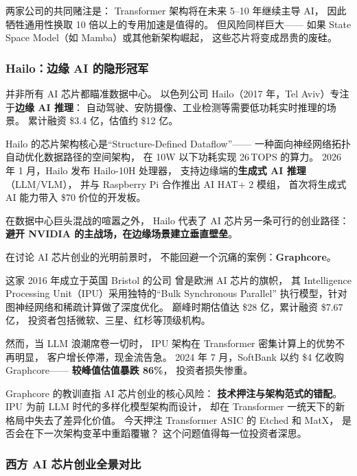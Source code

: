 两家公司的共同赌注是：
Transformer 架构将在未来 5--10 年继续主导 AI，
因此牺牲通用性换取 10 倍以上的专用加速是值得的。
但风险同样巨大——
如果 State Space Model（如 Mamba）或其他新架构崛起，
这些芯片将变成昂贵的废硅。

\subsubsection{Hailo：边缘 AI 的隐形冠军}

并非所有 AI 芯片都瞄准数据中心。
以色列公司 Hailo（2017 年，Tel Aviv）专注于\textbf{边缘 AI 推理}：
自动驾驶、安防摄像、工业检测等需要低功耗实时推理的场景。
累计融资 \$3.4 亿，估值约 \$12 亿。

Hailo 的芯片架构核心是``Structure-Defined Dataflow''——
一种面向神经网络拓扑自动优化数据路径的空间架构，
在 10W 以下功耗实现 26\,TOPS 的算力。
2026 年 1 月，Hailo 发布 Hailo-10H 处理器，
支持边缘端的\textbf{生成式 AI 推理}（LLM/VLM），
并与 Raspberry Pi 合作推出 AI HAT+ 2 模组，
首次将生成式 AI 能力带入 \$70 价位的开发板。

在数据中心巨头混战的喧嚣之外，
Hailo 代表了 AI 芯片另一条可行的创业路径：
\textbf{避开 NVIDIA 的主战场，在边缘场景建立垂直壁垒}。

\begin{warnbox}
在讨论 AI 芯片创业的光明前景时，
不能回避一个沉痛的案例：\textbf{Graphcore}。

这家 2016 年成立于英国 Bristol 的公司
曾是欧洲 AI 芯片的旗帜，
其 Intelligence Processing Unit（IPU）采用独特的``Bulk Synchronous Parallel''
执行模型，针对图神经网络和稀疏计算做了深度优化。
巅峰时期估值达 \$28 亿，累计融资 \$7.67 亿，
投资者包括微软、三星、红杉等顶级机构。

然而，当 LLM 浪潮席卷一切时，
IPU 架构在 Transformer 密集计算上的优势不再明显，
客户增长停滞，现金流告急。
2024 年 7 月，SoftBank 以约 \$4 亿收购 Graphcore——
\textbf{较峰值估值暴跌 86\%}，
投资者损失惨重。

Graphcore 的教训直指 AI 芯片创业的核心风险：
\textbf{技术押注与架构范式的错配}。
IPU 为前 LLM 时代的多样化模型架构而设计，
却在 Transformer 一统天下的新格局中失去了差异化价值。
今天押注 Transformer ASIC 的 Etched 和 MatX，
是否会在下一次架构变革中重蹈覆辙？
这个问题值得每一位投资者深思。
\end{warnbox}

\subsubsection{西方 AI 芯片创业全景对比}

